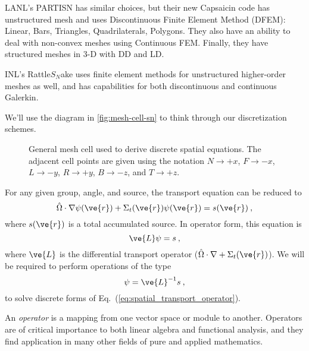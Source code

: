 \documentclass[12pt]{article}
\newcommand{\vOmega}{\ensuremath{\hat{\Omega}}}
\begin{document}
LANL's PARTISN has similar choices, but their new Capsaicin code has unstructured mesh and uses Discontinuous Finite Element Method (DFEM): Linear, Bars, Triangles, Quadrilaterals, Polygons. They also have an ability to deal with non-convex meshes using Continuous FEM. Finally, they have structured meshes in 3-D with DD and LD.

INL's Rattle$S_N$ake uses finite element methods for unstructured higher-order
meshes as well, and has capabilities for both discontinuous and continuous Galerkin.

We'll use the diagram in \autoref{fig:mesh-cell-sn} to think through our discretization schemes.
\begin{figure}[h!]
  \begin{center}
    
  \end{center}
  \caption{General mesh cell used to derive discrete spatial
    equations.  The adjacent cell points are given using the notation
    $N\rightarrow +x$, $F\rightarrow -x$, $L\rightarrow -y$, $R\rightarrow
    +y$, $B\rightarrow -z$, and $T\rightarrow +z$.}
  \label{fig:mesh-cell-sn}
\end{figure}

For any given group, angle, and source, the transport equation can be reduced to
\begin{equation}
  \vOmega\cdot\nabla\psi(\ve{r}) + \Sigma_t(\ve{r})\psi(\ve{r}) =
  s(\ve{r})\:,
  \label{eq:spatial_transport}
\end{equation}
where $s(\ve{r})$ is a total accumulated source.  In operator form, this
equation is
\begin{equation}
  \ve{L}\psi = s\:,
  \label{eq:spatial_transport_operator}
\end{equation}
where $\ve{L}$ is the differential transport operator ($\vOmega\cdot\nabla + \Sigma_t(\ve{r})$).  We will be required to perform operations of the type
\begin{equation}
  \psi = \ve{L}^{-1}s\:,
\end{equation}
to solve discrete forms of Eq.~(\ref{eq:spatial_transport_operator}).  

An \textit{operator} is a mapping from one vector space or module to another. Operators are of critical importance to both linear algebra and functional analysis, and they find application in many other fields of pure and applied mathematics.
\end{document}
